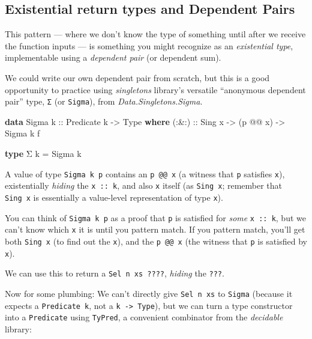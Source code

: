 \documentclass[]{article}
\newenvironment{Shaded}{}{}
\newcommand{\DataTypeTok}[1]{\textcolor[rgb]{0.56,0.13,0.00}{#1}}
\newcommand{\FunctionTok}[1]{\textcolor[rgb]{0.02,0.16,0.49}{#1}}
\newcommand{\KeywordTok}[1]{\textcolor[rgb]{0.00,0.44,0.13}{\textbf{#1}}}
\newcommand{\NormalTok}[1]{#1}
\newcommand{\OtherTok}[1]{\textcolor[rgb]{0.00,0.44,0.13}{#1}}
\begin{document}
\hypertarget{existential-return-types-and-dependent-pairs}{%
\subsection{Existential return types and Dependent
Pairs}\label{existential-return-types-and-dependent-pairs}}

This pattern --- where we don't know the type of something until after we
receive the function inputs --- is something you might recognize as an
\emph{existential type}, implementable using a \emph{dependent pair} (or
dependent sum).

We could write our own dependent pair from scratch, but this is a good
opportunity to practice using \emph{singletons} library's versatile ``anonymous
dependent pair'' type, \texttt{Σ} (or \texttt{Sigma}), from
\emph{Data.Singletons.Sigma}.

\begin{Shaded}
\begin{Highlighting}[]
\KeywordTok{data} \DataTypeTok{Sigma}\OtherTok{ k ::} \DataTypeTok{Predicate}\NormalTok{ k }\OtherTok{->} \DataTypeTok{Type} \KeywordTok{where}
\OtherTok{    (:&:) ::} \DataTypeTok{Sing}\NormalTok{ x }\OtherTok{->}\NormalTok{ (p }\FunctionTok{@@}\NormalTok{ x) }\OtherTok{->} \DataTypeTok{Sigma}\NormalTok{ k f}

\KeywordTok{type}\NormalTok{ Σ k }\FunctionTok{=} \DataTypeTok{Sigma}\NormalTok{ k}
\end{Highlighting}
\end{Shaded}

A value of type \texttt{Sigma\ k\ p} contains an \texttt{p\ @@\ x} (a witness
that \texttt{p} satisfies \texttt{x}), existentially \emph{hiding} the
\texttt{x\ ::\ k}, and also \texttt{x} itself (as \texttt{Sing\ x}; remember
that \texttt{Sing\ x} is essentially a value-level representation of type
\texttt{x}).

You can think of \texttt{Sigma\ k\ p} as a proof that \texttt{p} is satisfied
for \emph{some} \texttt{x\ ::\ k}, but we can't know which \texttt{x} it is
until you pattern match. If you pattern match, you'll get both \texttt{Sing\ x}
(to find out the \texttt{x}), and the \texttt{p\ @@\ x} (the witness that
\texttt{p} is satisfied by \texttt{x}).

We can use this to return a \texttt{Sel\ n\ xs\ ????}, \emph{hiding} the
\texttt{???}.

Now for some plumbing: We can't directly give \texttt{Sel\ n\ xs} to
\texttt{Sigma} (because it expects a \texttt{Predicate\ k}, not a
\texttt{k\ -\textgreater{}\ Type}), but we can turn a type constructor into a
\texttt{Predicate} using \texttt{TyPred}, a convenient combinator from the
\emph{decidable} library:
\end{document}
